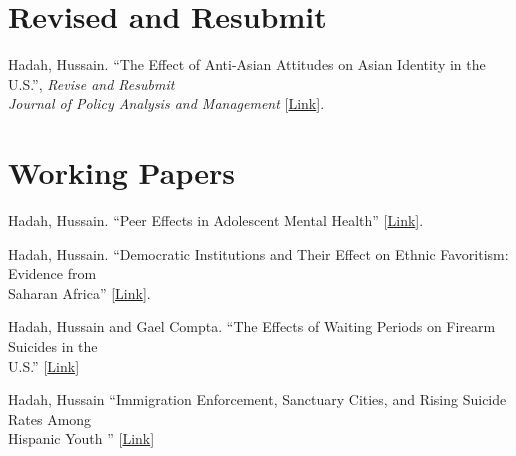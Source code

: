 \documentclass[letterpaper]{article}
\renewenvironment{itemize}{
  \begin{list}{}{
    \setlength{\leftmargin}{1.5em}
  }
}{
  \end{list}
}
\begin{document}
\section*{Revised and Resubmit}
\vspace{2 mm}
\begin{itemize}
  \item Hadah, Hussain. ``The Effect of Anti-Asian Attitudes on Asian Identity in the U.S.'', \textit{Revise and Resubmit} \\{\makebox[4mm]{\hfill}} \textit{Journal of Policy Analysis and Management} [\href{https://hhadah.github.io/asian-identity-attrition/my_paper/submit_preprint.pdf}{Link}]. 
\end{itemize}
\vspace{2 mm}
\section*{Working Papers}
\vspace{2 mm}
\begin{itemize}
  \item Hadah, Hussain. ``Peer Effects in Adolescent Mental Health'' [\href{https://hhadah.github.io/Depression_Idea/my_paper/Hadah-Peer-Effect-Depression.pdf}{Link}].
  \item Hadah, Hussain. ``Democratic Institutions and Their Effect on Ethnic Favoritism: Evidence from \\{\makebox[4mm]{\hfill}} Saharan Africa'' [\href{https://dx.doi.org/10.2139/ssrn.4566225}{Link}].
  \item Hadah, Hussain and Gael Compta\student. ``The Effects of Waiting Periods on Firearm Suicides in the \\{\makebox[4mm]{\hfill}} U.S.'' [\href{https://dx.doi.org/10.2139/ssrn.5383500}{Link}]
\studentnote
  \item Hadah, Hussain ``Immigration Enforcement, Sanctuary Cities, and Rising Suicide Rates Among\\{\makebox[4mm]{\hfill}}Hispanic Youth '' [\href{https://hhadah.github.io/sc-and-hispanic-children-suicide/my_paper/sc_and_hispanic_children_suicide.pdf}{Link}]
\end{itemize}
\vspace{2 mm}
\end{document}
